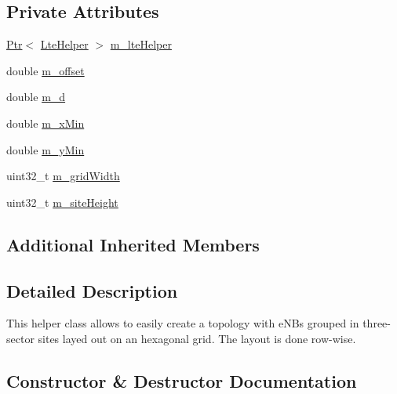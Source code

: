 \subsection*{Private Attributes}
\begin{DoxyCompactItemize}
\item 
\hyperlink{classns3_1_1Ptr}{Ptr}$<$ \hyperlink{classns3_1_1LteHelper}{Lte\+Helper} $>$ \hyperlink{classns3_1_1LteHexGridEnbTopologyHelper_a6998a2a11adc9e072926db5b03be6a28}{m\+\_\+lte\+Helper}
\item 
double \hyperlink{classns3_1_1LteHexGridEnbTopologyHelper_ad2c5634d5b3743e525cedec64ccaa9fe}{m\+\_\+offset}
\item 
double \hyperlink{classns3_1_1LteHexGridEnbTopologyHelper_a4cb78cf5b28239336ec6d88fe1743c7f}{m\+\_\+d}
\item 
double \hyperlink{classns3_1_1LteHexGridEnbTopologyHelper_a5486ea38b22f6e0c9c9fb7125aea6321}{m\+\_\+x\+Min}
\item 
double \hyperlink{classns3_1_1LteHexGridEnbTopologyHelper_a87668f1e7197c17dee55fd90c9c94f7d}{m\+\_\+y\+Min}
\item 
uint32\+\_\+t \hyperlink{classns3_1_1LteHexGridEnbTopologyHelper_a9a1f31192fb0859dd0a3dec3f776da25}{m\+\_\+grid\+Width}
\item 
uint32\+\_\+t \hyperlink{classns3_1_1LteHexGridEnbTopologyHelper_af38a5c65a2918c9019697aba8fef42d5}{m\+\_\+site\+Height}
\end{DoxyCompactItemize}
\subsection*{Additional Inherited Members}


\subsection{Detailed Description}
This helper class allows to easily create a topology with e\+N\+Bs grouped in three-\/sector sites layed out on an hexagonal grid. The layout is done row-\/wise. 

\subsection{Constructor \& Destructor Documentation}

